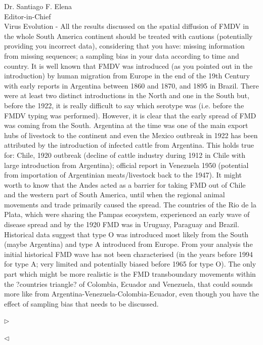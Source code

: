 \documentclass[ucla,biomath,12pt,noaddrfooter,datefrom]{UC_letter}
\newenvironment{reply}{$\triangleright$\bf}{$\triangleleft$}
\begin{document}
\begin{letter}{
Dr. Santiago F. Elena \\
Editor-in-Chief \\
Virus Evolution
}
-       All the results discussed on the spatial diffusion of FMDV in the whole South America continent should be treated with cautions (potentially providing you incorrect data), considering that you have: missing information from missing sequences; a sampling bias in your data according to time and country. 
It is well known that FMDV was introduced (as you pointed out in the introduction) by human migration from Europe in the end of the 19th Century with early reports in Argentina between 1860 and 1870, and 1895 in Brazil. 
There were at least two distinct introductions in the North and one in the South but, before the 1922, it is really difficult to say which serotype was (i.e. before the FMDV typing was performed). 
However, it is clear that the early spread of FMD was coming from the South. 
Argentina at the time was one of the main export hubs of livestock to the continent and even the Mexico outbreak in 1922 has been attributed by the introduction of infected cattle from Argentina. 
This holds true for: Chile, 1920 outbreak (decline of cattle industry during 1912 in Chile with large introduction from Argentina); official report in Venezuela 1950 (potential from importation of Argentinian meats/livestock back to the 1947). 
It might worth to know that the Andes acted as a barrier for taking FMD out of Chile and the western part of South America, until when the regional animal movements and trade primarily caused the spread. 
The countries of the Rio de la Plata, which were sharing the Pampas ecosystem, experienced an early wave of disease spread and by the 1920 FMD was in Uruguay, Paraguay and Brazil. 
Historical data suggest that type O was introduced most likely from the South (maybe Argentina) and type A introduced from Europe. 
From your analysis the initial historical FMD wave has not been characterised (in the years before 1994 for type A; very limited and potentially biased before 1965 for type O). 
The only part which might be more realistic is the FMD transboundary movements within the ?countries triangle? of Colombia, Ecuador and Venezuela, that could sounds more like from Argentina-Venezuela-Colombia-Ecuador, even though you have the effect of sampling bias that needs to be discussed.

\begin{reply}

\end{reply}


\end{letter}
\end{document}
